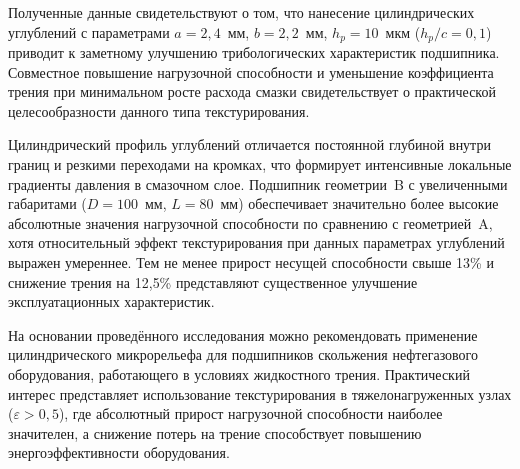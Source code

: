 Полученные данные свидетельствуют о том, что нанесение цилиндрических углублений с параметрами $a = 2{,}4$~мм, $b = 2{,}2$~мм, $h_p = 10$~мкм ($h_p/c = 0{,}1$) приводит к заметному улучшению трибологических характеристик подшипника. Совместное повышение нагрузочной способности и уменьшение коэффициента трения при минимальном росте расхода смазки свидетельствует о практической целесообразности данного типа текстурирования.

Цилиндрический профиль углублений отличается постоянной глубиной внутри границ и резкими переходами на кромках, что формирует интенсивные локальные градиенты давления в смазочном слое. Подшипник геометрии~B с увеличенными габаритами ($D = 100$~мм, $L = 80$~мм) обеспечивает значительно более высокие абсолютные значения нагрузочной способности по сравнению с геометрией~A, хотя относительный эффект текстурирования при данных параметрах углублений выражен умереннее. Тем не менее прирост несущей способности свыше 13\% и снижение трения на 12{,}5\% представляют существенное улучшение эксплуатационных характеристик.

На основании проведённого исследования можно рекомендовать применение цилиндрического микрорельефа для подшипников скольжения нефтегазового оборудования, работающего в условиях жидкостного трения. Практический интерес представляет использование текстурирования в тяжелонагруженных узлах ($\varepsilon > 0{,}5$), где абсолютный прирост нагрузочной способности наиболее значителен, а снижение потерь на трение способствует повышению энергоэффективности оборудования.
